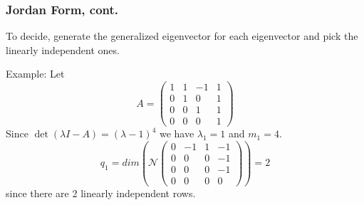 \documentclass{beamer}
\begin{document}
\begin{frame}\frametitle{Jordan Form, cont.}
	To decide, generate the generalized eigenvector for each eigenvector
	and pick the linearly independent ones.
	
	Example:  Let
	\[ 
		A = \begin{pmatrix}
	    		1 & 1 & -1 & 1\\
	    		0 & 1 & 0 & 1\\
	    		0 & 0 & 1 & 1\\
	    		0 & 0 & 0 & 1
	  		\end{pmatrix}
	\]
	Since $\det(\lambda I - A) = (\lambda-1)^4$ we have $\lambda_1 = 1$
	and $m_1 = 4$.
	\[ 
		q_1 = dim(\mathcal{N}
				\begin{pmatrix}
	    			0 & -1 & 1 & -1\\
	    			0 & 0 & 0 & -1\\
	    			0 & 0 & 0 & -1\\
	    			0 & 0 & 0 & 0
	  			\end{pmatrix}
	  		   ) 
	  		= 2
	\] 
	since there are 2 linearly independent rows.
	
\end{frame}
\end{document}
